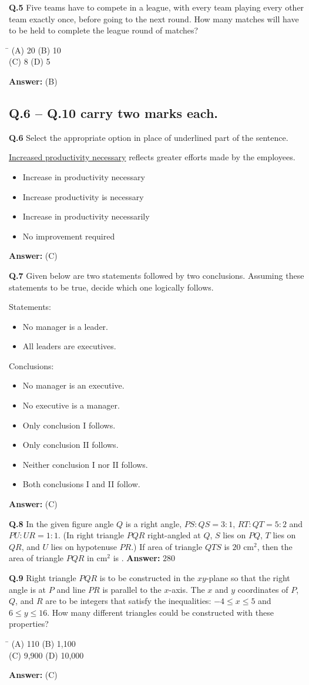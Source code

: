 \documentclass[11pt,a4paper]{article}
\newcommand{\optsfourA}[4]{%
  \begin{tabbing}
    \hspace{0.48\linewidth}\=\kill
    (A) #1 \> (B) #2 \\[2pt]
    (C) #3 \> (D) #4
  \end{tabbing}%
}
\newcommand{\optslistA}[4]{%
  \begin{itemize}
    \setlength{\itemsep}{2pt}\setlength{\parskip}{0pt}
    \item[(A)] #1
    \item[(B)] #2
    \item[(C)] #3
    \item[(D)] #4
  \end{itemize}%
}
\newcommand{\ans}[1]{\textbf{Answer:} #1\par\medskip}
\begin{document}
\textbf{Q.5} Five teams have to compete in a league, with every team playing every other team exactly once, before going to the next round. How many matches will have to be held to complete the league round of matches?
\optsfourA{20}{10}{8}{5}
\ans{(B)}

\subsection*{Q.6 -- Q.10 carry two marks each.}

\textbf{Q.6} Select the appropriate option in place of underlined part of the sentence.

\underline{Increased productivity necessary} reflects greater efforts made by the employees.
\optslistA{Increase in productivity necessary}{Increase productivity is necessary}{Increase in productivity necessarily}{No improvement required}
\ans{(C)}

\textbf{Q.7} Given below are two statements followed by two conclusions. Assuming these statements to be true, decide which one logically follows.

Statements:
\begin{itemize}
  \setlength{\itemsep}{1pt}\setlength{\parskip}{0pt}
  \item[I.] No manager is a leader.
  \item[II.] All leaders are executives.
\end{itemize}
Conclusions:
\begin{itemize}
  \setlength{\itemsep}{1pt}\setlength{\parskip}{0pt}
  \item[I.] No manager is an executive.
  \item[II.] No executive is a manager.
\end{itemize}
\optslistA{Only conclusion I follows.}{Only conclusion II follows.}{Neither conclusion I nor II follows.}{Both conclusions I and II follow.}
\ans{(C)}

\textbf{Q.8} In the given figure angle $Q$ is a right angle, $PS:QS = 3:1$, $RT:QT = 5:2$ and $PU:UR = 1:1$. (In right triangle $PQR$ right-angled at $Q$, $S$ lies on $PQ$, $T$ lies on $QR$, and $U$ lies on hypotenuse $PR$.) If area of triangle $QTS$ is $20\text{ cm}^2$, then the area of triangle $PQR$ in $\text{cm}^2$ is \underline{\hspace{2cm}}.
\ans{$280$}

\textbf{Q.9} Right triangle $PQR$ is to be constructed in the $xy$-plane so that the right angle is at $P$ and line $PR$ is parallel to the $x$-axis. The $x$ and $y$ coordinates of $P$, $Q$, and $R$ are to be integers that satisfy the inequalities: $-4 \le x \le 5$ and $6 \le y \le 16$. How many different triangles could be constructed with these properties?
\optsfourA{110}{1,100}{9,900}{10,000}
\ans{(C)}
\end{document}
